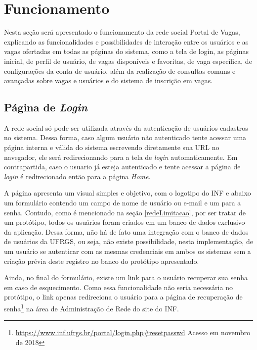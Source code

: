 \documentclass[cic,tc]{iiufrgs}
\begin{document}
\section{Funcionamento}
\label{PDVFuncionamento}

Nesta seção será apresentado o funcionamento da rede social Portal de Vagas, explicando as funcionalidades e possibilidades de interação entre os usuários e as vagas ofertadas em todas as páginas do sistema, como a tela de login, as páginas inicial, de perfil de usuário, de vagas disponíveis e favoritas, de vaga específica, de configurações da conta de usuário, além da realização de consultas comuns e avançadas sobre vagas e usuários e do sistema de inscrição em vagas.

\subsection{Página de \textit{Login}}
\label{PDVFunLogin}

A rede social só pode ser utilizada através da autenticação de usuários cadastros no sistema. Dessa forma, caso algum usuário não autenticado tente acessar uma página interna e válida do sistema escrevendo diretamente sua URL no navegador, ele será redirecionando para a tela de \textit{login} automaticamente. Em contrapartida, caso o usuario já esteja autenticado e tente acessar a página de \textit{login} é redirecionado então para a página \textit{Home}.

A página apresenta um visual simples e objetivo, com o logotipo do INF e abaixo um formulário contendo um campo de nome de usuário ou e-mail e um para a senha. Contudo, como é mencionado na seção \ref{redeLimitacao}, por ser tratar de um protótipo, todos os usuários foram criados em um banco de dados exclusivo da aplicação. Dessa forma, não há de fato uma integração com o banco de dados de usuários da UFRGS, ou seja, não existe possibilidade, nesta implementação, de um usuário se autenticar com as mesmas credenciais em ambos os sistemas sem a criação prévia deste registro no banco do protótipo apresentado. 

Ainda, no final do formulário, existe um link para o usuário recuperar sua senha em caso de esquecimento. Como essa funcionalidade não seria necessária no protótipo, o link apenas redireciona o usuário para a página de recuperação de senha\footnote{\url{https://www.inf.ufrgs.br/portal/login.php\#resetpasswd} Acesso em novembro de 2018} na área de Administração de Rede do site do INF.
\end{document}
